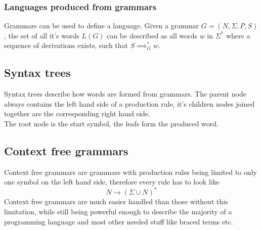\documentclass[a4paper]{article}
\newcommand{\tuple}[1]{\left( #1 \right)}
\begin{document}
\subsubsection{Languages produced from grammars}
Grammars can be used to define a language. Given a grammar $G = \tuple{N, \Sigma, P, S}$, the set of all it's words $L(G)$ can be described as all words $w$ in $\Sigma^*$ where a sequence of derivations exists, such that $S\implies_G^* w$. 

\subsection{Syntax trees}
Syntax trees describe how words are formed from grammars. The parent node always contains the left hand side of a production rule, it's children nodes joined together are the corresponding right hand side.\\
The root node is the start symbol, the leafs form the produced word.

\subsection{Context free grammars}
Context free grammars are grammars with production rules being limited to only one symbol on the left hand side, therefore every rule has to look like 
$$N \to (\Sigma\cup N)^* $$
Context free grammars are much easier handled than those without this limitation, while still being powerful enough to describe the majority of a programming language and most other needed stuff like braced terms etc.
\end{document}

